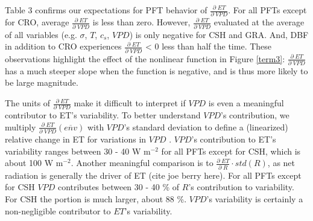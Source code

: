 \documentclass[draft,linenumbers]{agujournal}
\begin{document}
Table 3 confirms our expectations for PFT behavior of $\frac{\partial \; ET}{\partial \; VPD}$. For all PFTs except for CRO, average $\frac{\partial \; ET}{\partial \; VPD}$ is less than zero. However, $\frac{\partial \; ET}{\partial \; VPD}$ evaluated at the average of all variables (e.g. $\sigma$, $T$, $c_s$, $VPD$) is only negative for CSH and GRA. And, DBF in addition to CRO experiences $\frac{\partial \; ET}{\partial \; VPD}$ < 0 less than half the time. These observations highlight the effect of the nonlinear function in Figure \ref{term3}: $\frac{\partial \; ET}{\partial \; VPD}$ has a much steeper slope when the function is negative, and is thus more likely to be large magnitude.

The units of $\frac{\partial \; ET}{\partial \; VPD}$ make it difficult to interpret if $VPD$ is even a meaningful contributor to ET's variability. To better understand $VPD$'s contribution, we multiply $\frac{\partial \; ET}{\partial \; VPD}\left(\overline{env}\right)$ with $VPD$'s standard deviation to define a (linearized) relative change in ET for variations in $VPD$ . $VPD$'s contribution to ET's variability ranges between 30 - 40 W m$^{-2}$ for all PFTs except for CSH, which is about 100 W m$^{-2}$. Another meaningful comparison is to $\frac{\partial \; ET}{\partial \; R} \cdot std(R)$, as net radiation is generally the driver of ET (cite joe berry here). For all PFTs except for CSH $VPD$ contributes between 30 - 40 \% of $R$'s contribution to variability. For CSH the portion is much larger, about 88 \%. $VPD$'s variability is certainly a non-negligible contributor to $ET$'s variability.
\end{document}
